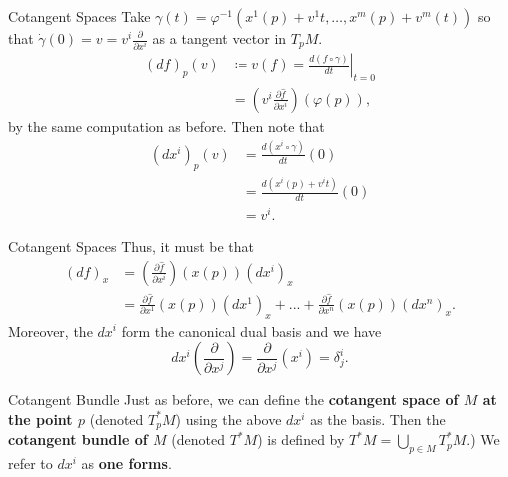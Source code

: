 \documentclass[usenames,dvipsnames]{beamer}
\theoremstyle{definition}
\theoremstyle{theorem}
\begin{document}
        \begin{frame}{Cotangent Spaces}
            Take $\gamma(t)=\varphi^{-1}(x^1(p)+v^1t,\dots,x^m(p)+v^m(t))$ so that $\dot{\gamma}(0)=v=v^i \frac{\partial}{\partial x^i}$ as a tangent vector in $T_pM$.
            \begin{align*}
                (df)_p(v)&\coloneqq v(f)=\left.\frac{d(f\circ \gamma)}{dt}\right|_{t=0}\\
                &= \left(v^i \frac{\partial \hat{f}}{\partial x^i}\right)(\varphi(p)),
            \end{align*}
            by the same computation as before. Then note that
            \begin{align*}
                (dx^i)_p(v)&=\frac{d(x^i\circ \gamma)}{dt}(0)\\
                &= \frac{d(x^i(p)+v^i t)}{dt}(0)\\
                &= v^i.
            \end{align*}
        \end{frame}
        
        \begin{frame}{Cotangent Spaces}
            Thus, it must be that
            \begin{align*}
                (df)_x &= \left(\frac{\partial \hat{f}}{\partial x^i}\right)(x(p))(dx^i)_x\\
                &=  \frac{\partial \hat{f}}{\partial x^1}(x(p))\left(dx^1\right)_x + ... + \frac{\partial \hat{f}}{\partial x^n}(x(p))\left(dx^n\right)_x.
            \end{align*}
            Moreover, the $dx^i$ form the canonical dual basis and we have
            \[
            dx^i\left( \frac{\partial}{\partial x^j}\right) = \frac{\partial}{\partial x^j}(x^i)=\delta_j^i.
            \]
        \end{frame}

        \begin{frame}{Cotangent Bundle}
            Just as before, we can define the \textbf{cotangent space of $M$ at the point $p$} (denoted $T_p^*M$) using the above $dx^i$ as the basis.  Then the \textbf{cotangent bundle of $M$} (denoted $T^*M$) is defined by $T^*M=\bigcup_{p\in M} T_p^*M$.) We refer to $dx^i$ as \textbf{one forms}.
        \end{frame}
\end{document}
